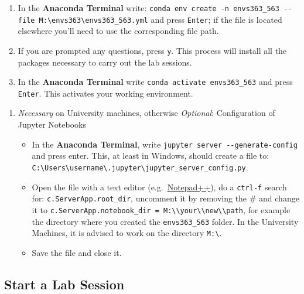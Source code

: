 \documentclass[
  letterpaper,
  DIV=11,
  numbers=noendperiod]{scrreprt}
\providecommand{\tightlist}{%
  \setlength{\itemsep}{0pt}\setlength{\parskip}{0pt}}\usepackage{longtable,booktabs,array}
\begin{document}
\begin{enumerate}
\def\labelenumi{\arabic{enumi}.}
\setcounter{enumi}{2}
\tightlist
\item
  In the \textbf{Anaconda Terminal} write:
  \texttt{conda\ env\ create\ -n\ envs363\_563\ -\/-file\ M:\textbackslash{}envs363\textbackslash{}envs363\_563.yml}
  and press \texttt{Enter}; if the file is located elsewhere you'll need
  to use the corresponding file path.
\item
  If you are prompted any questions, press \texttt{y}. This process will
  install all the packages necessary to carry out the lab sessions.
\item
  In the \textbf{Anaconda Terminal} write
  \texttt{conda\ activate\ envs363\_563} and press \texttt{Enter}. This
  activates your working environment.
\end{enumerate}

\begin{enumerate}
\def\labelenumi{\arabic{enumi}.}
\setcounter{enumi}{5}
\tightlist
\item
  \emph{Necessary} on University machines, otherwise \emph{Optional}:
  Configuration of Jupyter Notebooks

  \begin{itemize}
  \tightlist
  \item
    In the \textbf{Anaconda Terminal}, write
    \texttt{jupyter\ server\ -\/-generate-config} and press enter. This,
    at least in Windows, should create a file to:
    \texttt{C:\textbackslash{}Users\textbackslash{}username\textbackslash{}.jupyter\textbackslash{}jupyter\_server\_config.py}.
  \item
    Open the file with a text editor
    (e.g.~\href{https://notepad-plus-plus.org}{Notepad++}), do a
    \texttt{ctrl-f} search for: \texttt{c.ServerApp.root\_dir},
    uncomment it by removing the \# and change it to
    \texttt{c.ServerApp.notebook\_dir\ =\ \textquotesingle{}M:\textbackslash{}\textbackslash{}your\textbackslash{}\textbackslash{}new\textbackslash{}\textbackslash{}path},
    for example the directory where you created the
    \texttt{envs363\_563} folder. In the University Machines, it is
    advised to work on the directory \texttt{M:\textbackslash{}}.
  \item
    Save the file and close it.
  \end{itemize}
\end{enumerate}

\subsection*{Start a Lab Session}\label{start-a-lab-session}
\end{document}
